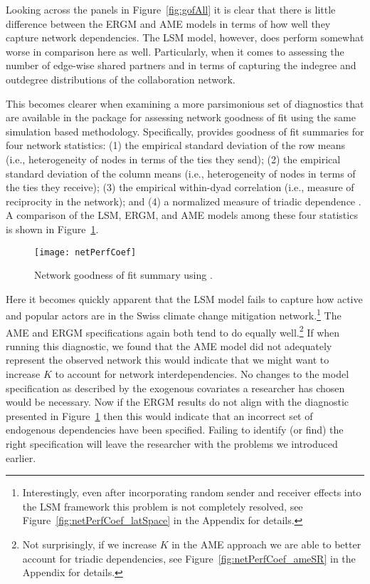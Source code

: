 Looking across the panels in Figure~\ref{fig:gofAll} it is clear that there is little difference between the ERGM and AME models in terms of how well they capture network dependencies. The LSM model, however, does perform somewhat worse in comparison here as well. Particularly, when it comes to assessing the number of edge-wise shared partners and in terms of capturing the indegree and outdegree distributions of the collaboration network. 

This becomes clearer when examining a more parsimonious set of diagnostics that are available in the  package for assessing network goodness of fit using the same simulation based methodology. Specifically,  provides goodness of fit summaries for four network statistics: (1) the empirical standard deviation of the row means (i.e., heterogeneity of nodes in terms of the ties they send); (2) the empirical standard deviation of the column means (i.e., heterogeneity of nodes in terms of the ties they receive); (3) the empirical within-dyad correlation (i.e., measure of reciprocity in the network); and (4) a normalized measure of triadic dependence \citep{hoff:etal:2015}. A comparison of the LSM, ERGM, and AME models among these four statistics is shown in Figure~\ref{fig:ergmAmePerf}.

\begin{figure}[ht]
	\centering
	\texttt{[image: netPerfCoef]}
	\caption{Network goodness of fit summary using .}
	\label{fig:ergmAmePerf}
\end{figure}
\FloatBarrier

Here it becomes quickly apparent that the LSM model fails to capture how active and popular actors are in the Swiss climate change mitigation network.\footnote{Interestingly, even after incorporating random sender and receiver effects into the LSM framework this problem is not completely resolved, see Figure~\ref{fig:netPerfCoef_latSpace} in the Appendix for details.} The AME and ERGM specifications again both tend to do equally well.\footnote{Not surprisingly, if we increase $K$ in the AME approach we are able to better account for triadic dependencies, see Figure~\ref{fig:netPerfCoef_ameSR} in the Appendix for details.} If when running this diagnostic, we found that the AME model did not adequately represent the observed network this would indicate that we might want to increase $K$ to account for network interdependencies. No changes to the model specification as described by the exogenous covariates a researcher has chosen would be necessary. Now if the ERGM results do not align with the diagnostic presented in Figure~\ref{fig:ergmAmePerf} then this would indicate that an incorrect set of endogenous dependencies have been specified. Failing to identify (or find) the right specification will leave the researcher with the problems we introduced earlier.

